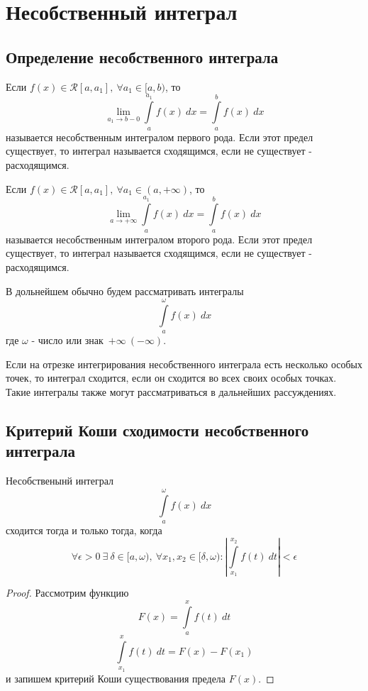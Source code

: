 \newpage
\section{Несобственный интеграл}
\subsection{Определение несобственного интеграла}
\begin{definition}
    Если $f(x)\in \mathcal{R}[a,a_1],\ \forall a_1\in [a,b)$, то 
    \[\lim\limits_{a_1\to b-0}\int\limits_{a}^{a_1}f(x)\ dx=\int\limits_{a}^{b}f(x)\ dx\]
    называется несобственным интегралом первого рода.
    Если этот предел существует, то интеграл называется сходящимся, если не существует - расходящимся. 
\end{definition} 
\begin{definition}
    Если $f(x)\in \mathcal{R}[a,a_1],\ \forall a_1\in (a, +\infty)$, то
    \[\lim\limits_{a\to +\infty} \int\limits_{a}^{a_1}f(x)\ dx=\int\limits_{a}^{b}f(x)\ dx\]
    называется несобственным интегралом второго рода. Если этот предел существует, то интеграл называется сходящимся, если не существует - расходящимся.
\end{definition} 
\begin{comm}
    В дольнейшем обычно будем рассматривать интегралы
    \[\int\limits_{a}^{\omega}f(x)\ dx\]
    где $\omega$ - число или знак\ $+\infty\ (-\infty)$.
\end{comm} 
\begin{comm}
    Если на отрезке интегрирования несобственного интеграла есть несколько особых точек, то интеграл сходится, если он сходится во всех своих особых точках. Такие интегралы также могут рассматриваться в дальнейших рассуждениях.
\end{comm}
\subsection{Критерий Коши сходимости несобственного интеграла}
\begin{theorem}
    Несобственынй интеграл
    \[\int\limits_{a}^{\omega}f(x)\ dx\]
    сходится тогда и только тогда, когда
    \[\forall \epsilon>0\ \exists\ \delta\in [a,\omega),\ \forall x_1,x_2\in [\delta, \omega): \left|\int\limits_{x_1}^{x_2}f(t)\ dt\right|<\epsilon\]
\end{theorem} 
\begin{proof}
    Рассмотрим функцию
    \[F(x)=\int\limits_{a}^{x}f(t)\ dt\]
    \[\int\limits_{x_1}^{x}f(t)\ dt=F(x)-F(x_1)\]
    и запишем критерий Коши существования предела $F(x)$.
\end{proof} 
